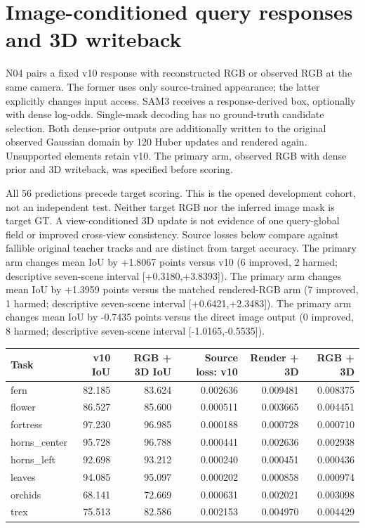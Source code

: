 \section{Image-conditioned query responses and 3D writeback}
N04 pairs a fixed v10 response with reconstructed RGB or observed RGB at the same camera. The former uses only source-trained appearance; the latter explicitly changes input access. SAM3 receives a response-derived box, optionally with dense log-odds. Single-mask decoding has no ground-truth candidate selection. Both dense-prior outputs are additionally written to the original observed Gaussian domain by 120 Huber updates and rendered again. Unsupported elements retain v10. The primary arm, observed RGB with dense prior and 3D writeback, was specified before scoring.
\begin{center}\small\end{center}
All 56 predictions precede target scoring. This is the opened development cohort, not an independent test. Neither target RGB nor the inferred image mask is target GT. A view-conditioned 3D update is not evidence of one query-global field or improved cross-view consistency. Source losses below compare against fallible original teacher tracks and are distinct from target accuracy.
The primary arm changes mean IoU by +1.8067 points versus v10 (6 improved, 2 harmed; descriptive seven-scene interval [+0.3180,+3.8393]).
The primary arm changes mean IoU by +1.3959 points versus the matched rendered-RGB arm (7 improved, 1 harmed; descriptive seven-scene interval [+0.6421,+2.3483]).
The primary arm changes mean IoU by -0.7435 points versus the direct image output (0 improved, 8 harmed; descriptive seven-scene interval [-1.0165,-0.5535]).
\begin{center}\small\begin{tabular}{lrrrrr}\toprule
Task & v10 IoU & RGB + 3D IoU & Source loss: v10 & Render + 3D & RGB + 3D \\\midrule
fern & 82.185 & 83.624 & 0.002636 & 0.009481 & 0.008375 \\
flower & 86.527 & 85.600 & 0.000511 & 0.003665 & 0.004451 \\
fortress & 97.230 & 96.985 & 0.000188 & 0.000728 & 0.000710 \\
horns\_center & 95.728 & 96.788 & 0.000441 & 0.002636 & 0.002938 \\
horns\_left & 92.698 & 93.212 & 0.000240 & 0.000451 & 0.000436 \\
leaves & 94.085 & 95.097 & 0.000202 & 0.000858 & 0.000974 \\
orchids & 68.141 & 72.669 & 0.000631 & 0.002021 & 0.003098 \\
trex & 75.513 & 82.586 & 0.002153 & 0.004970 & 0.004429 \\
\bottomrule\end{tabular}\end{center}
